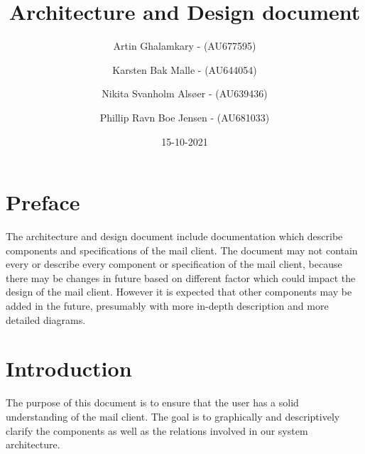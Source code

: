 \documentclass{article}
\title{Architecture and Design document} %
\author{Artin Ghalamkary - (AU677595) \and Karsten Bak Malle - (AU644054) \and Nikita Svanholm Alsøer - (AU639436) \and Phillip Ravn Boe Jensen - (AU681033)}%
\date{15-10-2021}
\begin{document}

\maketitle
\section*{Preface} 
The architecture and design document include documentation which describe components and specifications of the mail client. The document may not contain every or describe every component or specification of the mail client, because there may be changes in future based on different factor which could impact the design of the mail client. However it is expected that other components may be added in the future, presumably with more in-depth description and more detailed diagrams.


\section*{Introduction} 
The purpose of this document is to ensure that the user has a solid understanding of the mail client. The goal is to graphically and descriptively clarify the components as well as the relations involved in our system architecture.

\newpage
\end{document}
